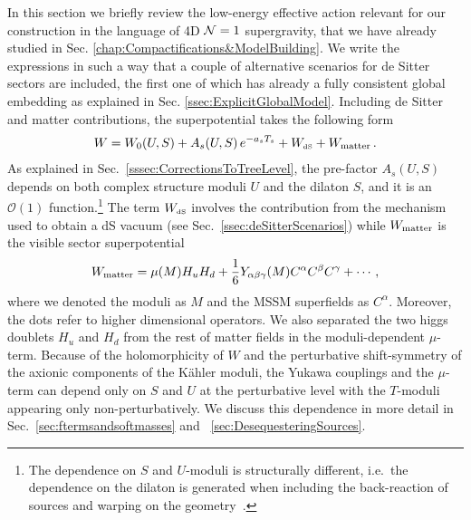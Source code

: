 \documentclass[12pt,a4paper]{book}
\def\dS{{\scriptscriptstyle \rm dS}}
\begin{document}
In this section we briefly review the low-energy effective action relevant for our construction in the language of 4D ${\cal N}=1$ supergravity, that we have already studied in Sec. \ref{chap:Compactifications&ModelBuilding}. We write the expressions in such a way that a couple of alternative scenarios for de Sitter sectors are included, the first one of which has already a fully consistent global embedding \cite{Cicoli:2012vw} as explained in Sec. \ref{ssec:ExplicitGlobalModel}. Including de Sitter and matter contributions, the superpotential takes the following form
\begin{align}
W= W_0(U,S) + A_s(U, S)\, e^{- a_s T_s} +  W_\dS+W_{\rm matter}\,.
\label{eq:FullSuperpotential}
\end{align}
As explained in Sec.~\ref{sssec:CorrectionsToTreeLevel}, the pre-factor $A_s(U,S)$ depends on both complex structure moduli $U$ and the dilaton $S$, and it is an $\mathcal{O}(1)$ function.\footnote{The dependence on $S$ and $U$-moduli is structurally different, i.e.~the dependence on the dilaton is generated when including the back-reaction of sources and warping on the geometry~\cite{Baumann:2006th}.} The term $W_\dS$ involves the contribution from the mechanism used to obtain a dS vacuum (see Sec.~\ref{ssec:deSitterScenarios}) while $W_{\rm matter}$ is the visible sector superpotential
\begin{align}
W_{\rm matter} = \mu(M) H_u H_d + \frac 16 Y_{\alpha\beta\gamma}(M) C^\alpha C^\beta C^\gamma + \cdots\,,
\label{Wmatter}
\end{align}
where we denoted the moduli as $M$ and the MSSM superfields as $C^\alpha$. Moreover, the dots refer to higher dimensional operators. We also separated the two higgs doublets $H_u$ and $H_d$ from the rest of matter fields in the moduli-dependent $\mu$-term. Because of the holomorphicity of $W$ and the perturbative shift-symmetry of the axionic components of the K\"ahler moduli, the Yukawa couplings and the $\mu$-term can depend only on $S$ and $U$ at the perturbative level with the $T$-moduli appearing only non-perturbatively. We discuss this dependence in more detail in Sec.~\ref{sec:ftermsandsoftmasses} and ~\ref{sec:DesequesteringSources}.\\
\end{document}

